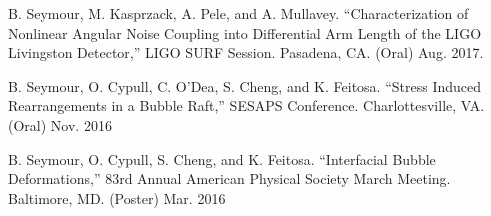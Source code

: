 \begin{cvpresentationsmod}

  \cvpresentation
    {B. Seymour, M. Kasprzack, A. Pele, and A. Mullavey. “Characterization of Nonlinear Angular Noise Coupling into Differential Arm Length of the LIGO Livingston Detector,” LIGO SURF Session. Pasadena, CA. (Oral)} %
    {Aug. 2017.} %



  \cvpresentation
    {B. Seymour, O. Cypull, C. O’Dea, S. Cheng, and K. Feitosa. “Stress Induced Rearrangements in a Bubble Raft,” SESAPS Conference. Charlottesville, VA. (Oral)} %
    {Nov. 2016} %









  \cvpresentation
    {B. Seymour, O. Cypull, S. Cheng, and K. Feitosa. “Interfacial Bubble Deformations,” 83rd Annual American Physical Society March Meeting. Baltimore, MD. (Poster)} %
    {Mar. 2016} %









\end{cvpresentationsmod}
